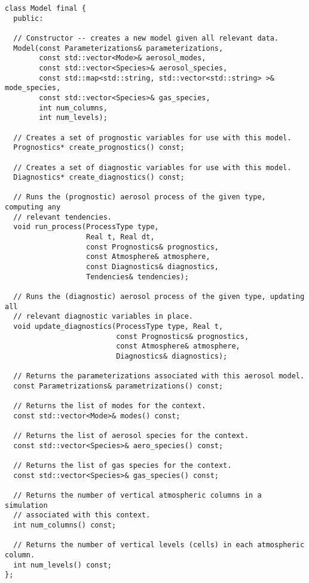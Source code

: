 \begin{lstlisting}
class Model final {
  public:

  // Constructor -- creates a new model given all relevant data.
  Model(const Parameterizations& parameterizations,
        const std::vector<Mode>& aerosol_modes,
        const std::vector<Species>& aerosol_species,
        const std::map<std::string, std::vector<std::string> >& mode_species,
        const std::vector<Species>& gas_species,
        int num_columns,
        int num_levels);

  // Creates a set of prognostic variables for use with this model.
  Prognostics* create_prognostics() const;

  // Creates a set of diagnostic variables for use with this model.
  Diagnostics* create_diagnostics() const;

  // Runs the (prognostic) aerosol process of the given type, computing any
  // relevant tendencies.
  void run_process(ProcessType type,
                   Real t, Real dt,
                   const Prognostics& prognostics,
                   const Atmosphere& atmosphere,
                   const Diagnostics& diagnostics,
                   Tendencies& tendencies);

  // Runs the (diagnostic) aerosol process of the given type, updating all
  // relevant diagnostic variables in place.
  void update_diagnostics(ProcessType type, Real t,
                          const Prognostics& prognostics,
                          const Atmosphere& atmosphere,
                          Diagnostics& diagnostics);

  // Returns the parameterizations associated with this aerosol model.
  const Parametrizations& parametrizations() const;

  // Returns the list of modes for the context.
  const std::vector<Mode>& modes() const;

  // Returns the list of aerosol species for the context.
  const std::vector<Species>& aero_species() const;

  // Returns the list of gas species for the context.
  const std::vector<Species>& gas_species() const;

  // Returns the number of vertical atmospheric columns in a simulation
  // associated with this context.
  int num_columns() const;

  // Returns the number of vertical levels (cells) in each atmospheric column.
  int num_levels() const;
};
\end{lstlisting}

